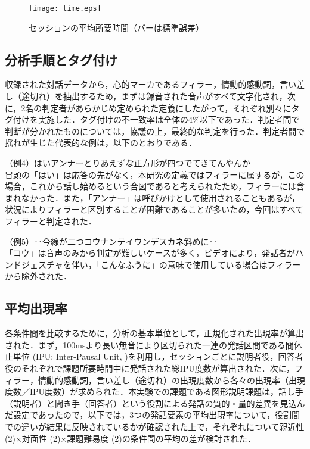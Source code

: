 \documentclass[japanese]{jnlp_1.3a}
\begin{document}
\begin{figure}[t]
      \begin{center}
      \texttt{[image: time.eps]}
      \caption{セッションの平均所要時間（バーは標準誤差）}
      
      \label{time}
      \end{center}
\end{figure}

\subsection{分析手順とタグ付け}
収録された対話データから，心的マーカであるフィラー，情動的感動詞，言い差し（途切れ）を抽出するため，まずは録音された音声がすべて文字化され，次に，2名の判定者があらかじめ定められた定義にしたがって，それぞれ別々にタグ付けを実施した．タグ付けの不一致率は全体の4\%以下であった．判定者間で判断が分かれたものについては，協議の上，最終的な判定を行った．判定者間で揺れが生じた代表的な例は，以下のとおりである．

\noindent（例4）はいアンナーとりあえずな正方形が四つでてきてんやんか\\
\noindent 冒頭の「はい」は応答の先がなく，本研究の定義ではフィラーに属するが，この場合，これから話し始めるという合図であると考えられたため，フィラーには含まれなかった．また，「アンナー」は呼びかけとして使用されることもあるが，状況によりフィラーと区別することが困難であることが多いため，今回はすべてフィラーと判定された．

\noindent（例5）‥今線が二つコウナンテイウンデスカネ斜めに‥\\
\noindent 「コウ」は音声のみから判定が難しいケースが多く，ビデオにより，発話者がハンドジェスチャを伴い，「こんなふうに」の意味で使用している場合はフィラーから除外された．

\subsection{平均出現率}

各条件間を比較するために，分析の基本単位として，正規化された出現率が算出された．まず，100msより長い無音により区切られた一連の発話区間である間休止単位 (IPU: Inter-Pausal Unit, )を利用し，セッションごとに説明者役，回答者役のそれぞれで課題所要時間中に発話された総IPU度数が算出された．次に，フィラー，情動的感動詞，言い差し（途切れ）の出現度数から各々の出現率（出現度数／IPU度数）が求められた．本実験での課題である図形説明課題は，話し手（説明者）と聞き手（回答者）という役割による発話の質的・量的差異を見込んだ設定であったので，以下では，3つの発話要素の平均出現率について，役割間での違いが結果に反映されているかが確認された上で，それぞれについて親近性 (2)×対面性 (2)×課題難易度 (2)の条件間の平均の差が検討された．
\end{document}
